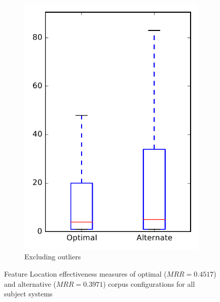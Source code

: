 \begin{figure}
\begin{subfigure}{.4\textwidth}
        \includegraphics[height=0.4\textheight]{figures/combo/flt_rq2_all_no_outlier}
        \caption{Excluding outliers}\label{fig:combo:flt:rq2:all_no_outlier}
    \end{subfigure}
\caption{Feature Location effectiveness measures of optimal ($MRR=0.4517$) and alternative ($MRR=0.3971$) corpus configurations for all subject systems}
\label{fig:combo:flt:rq2:all}
\end{figure}
